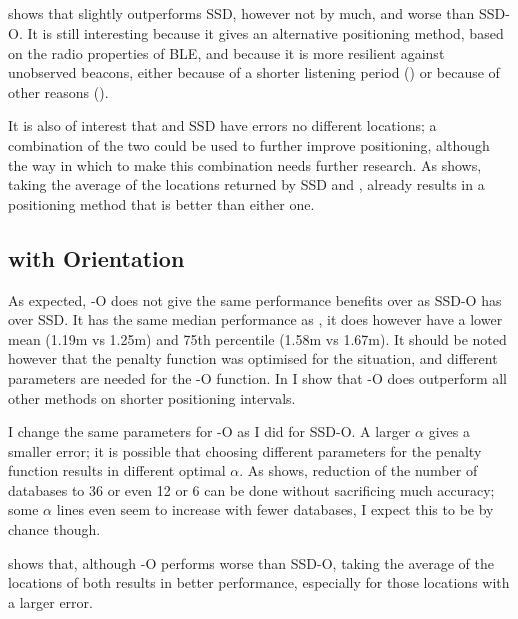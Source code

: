 \subsection{\BRP}
 shows that \aBRP slightly outperforms SSD, however not by much, and worse than SSD-O.
It is still interesting because it gives an alternative positioning method, based on the radio properties of BLE, and because it is more resilient against unobserved beacons, either because of a shorter listening period () or because of other reasons ().

It is also of interest that \aBRP and SSD have errors no different locations; a combination of the two could be used to further improve positioning, although the way in which to make this combination needs further research.
As  shows, taking the average of the locations returned by SSD and \aBRP, already results in a positioning method that is better than either one.

\subsection{\BRP with Orientation}
As expected, \aBRP-O does not give the same performance benefits over \aBRP as SSD-O has over SSD.
It has the same median performance as \aBRP, it does however have a lower mean (1.19m vs 1.25m) and 75th percentile (1.58m vs 1.67m).
It should be noted however that the \aBRP penalty function was optimised for the \aBRP situation, and different parameters are needed for the \aBRP-O function.
In  I show that \aBRP-O does outperform all other methods on shorter positioning intervals.

I change the same parameters for \aBRP-O as I did for SSD-O.
A larger $\alpha$ gives a smaller error; it is possible that choosing different parameters for the penalty function results in different optimal $\alpha$.
As  shows, reduction of the number of databases to 36 or even 12 or 6 can be done without sacrificing much accuracy; some $\alpha$ lines even seem to increase with fewer databases, I expect this to be by chance though.

 shows that, although \aBRP-O performs worse than SSD-O, taking the average of the locations of both results in better performance, especially for those locations with a larger error.

